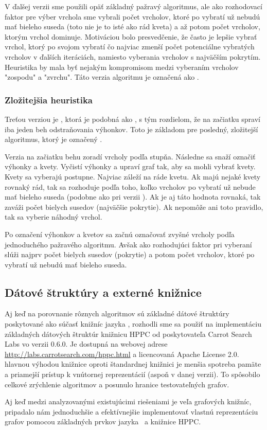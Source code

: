 V ďalšej verzii sme použili opäť základný pažravý algoritmus, ale ako 
rozhodovací faktor pre výber vrchola sme vybrali počet vrcholov, ktoré po 
vybratí už nebudú mať bieleho suseda (toto nie je to isté ako rád kveta) 
a až potom počet vrcholov, ktorým vrchol dominuje. Motiváciou bolo 
presvedčenie, že často je lepšie vybrať vrchol, ktorý po svojom vybratí čo 
najviac zmenší počet potenciálne vybratých vrcholov v ďalších iteráciách, 
namiesto vyberania vrcholov s najväčším pokrytím.
Heuristika by mala byť nejakým 
kompromisom medzi vyberaním vrcholov "zospodu" a "zvrchu". Táto verzia 
algoritmu je označená ako .

\subsubsection{Zložitejšia heuristika}

Treťou verziou je , ktorá je podobná ako , s tým 
rozdielom, že na začiatku spraví iba jeden beh odstraňovania výhonkov. Toto je 
základom pre posledný, zložitejší algoritmus, ktorý je označený . 

Verzia  na začiatku behu zoradí vrcholy podľa stupňa. Následne sa 
snaží označiť výhonky a kvety. Vyčistí výhonky a upraví graf tak, aby sa mohli 
vybrať kvety. Kvety sa vyberajú postupne. Najviac záleží na ráde kvetu. Ak majú 
nejaké kvety rovnaký rád, tak sa rozhoduje podľa toho, koľko vrcholov po 
vybratí už nebude mať bieleho suseda (podobne ako pri verzii ). 
Ak je aj táto hodnota rovnaká, tak zaváži počet bielych susedov (najväčšie 
pokrytie). Ak nepomôže ani toto pravidlo, tak sa vyberie náhodný vrchol.

Po označení výhonkov a kvetov sa začnú označovať zvyšné vrcholy podľa 
jednoduchého pažravého algoritmu. Avšak ako rozhodujúci faktor pri vyberaní 
slúži najprv počet bielych susedov (pokrytie) a potom počet vrcholov, ktoré 
po vybratí už nebudú mať bieleho suseda.

\subsection{Dátové štruktúry a externé knižnice}

Aj keď na porovnanie rôznych algoritmov sú základné dátové štruktúry 
poskytované ako súčasť knižníc jazyka \Java, rozhodli sme sa použiť na 
implementáciu základných dátových štruktúr knižnicu HPPC od poskytovateľa 
Carrot Search Labs vo verzii 0.6.0. Je dostupná na webovej adrese 
\url{http://labs.carrotsearch.com/hppc.html} a licencovaná Apache License 2.0. 
hlavnou výhodou knižnice oproti štandardnej knižnici je menšia spotreba pamäte 
a priamejší prístup k vnútornej reprezentácií (aspoň v danej verzii). To 
spôsobilo celkové zrýchlenie algoritmov a posunulo hranice testovateľných 
grafov.

Aj keď medzi analyzovanými existujúcimi riešeniami je veľa grafových knižníc, 
pripadalo nám jednoduchšie a efektívnejšie implementovať vlastnú reprezentáciu 
grafov pomocou základných prvkov jazyka \Java\ a knižnice HPPC.


